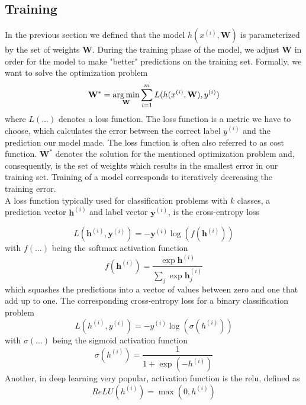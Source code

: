 \subsection{Training}
In the previous section we defined that the model $h(x^{(i)}, \mathbf{W})$ is parameterized by the set of weights $\textbf{W}$. During the training phase of the model, we adjust $\textbf{W}$ in order for the model to make "better" predictions on the training set. Formally, we want to solve the optimization problem
\begin{equation}
   \mathbf{W}^{*} = \operatorname*{arg\,min}_\textbf{W} \sum_{i=1}^{m} L(h(x^{(i)}, \mathbf{W}), y^{(i)})
   \label{eq:optimization}
\end{equation}
where $L(...)$ denotes a loss function. The loss function is a metric we have to choose, which calculates the error between the correct label $y^{(i)}$ and the prediction our model made. The loss function is often also referred to as cost function. $\mathbf{W}^{*}$ denotes the solution for the mentioned optimization problem and, consequently, is the set of weights which results in the smallest error in our training set. Training of a model corresponds to iteratively decreasing the training error.\\
A loss function typically used for classification problems with $k$ classes, a prediction vector $\mathbf{h}^{(i)}$ and label vector $\mathbf{y}^{(i)}$, is the cross-entropy loss

\begin{equation}
    L(\mathbf{h}^{(i)}, \mathbf{y}^{(i)}) = -\mathbf{y}^{(i)} \log(f(\mathbf{h}^{(i)}))
    \label{eq:cross_entropy_multi}
\end{equation}
with $f(...)$ being the softmax activation function
\begin{equation}
   f(\mathbf{h}^{(i)}) = \frac{\exp\mathbf{h}^{(i)}}{\sum_{j} \exp{\mathbf{h}^{(i)}_{j}}}
   \label{eq:softmax}
\end{equation}
which squashes the predictions into a vector of values between zero and one that add up to one. The corresponding cross-entropy loss for a binary classification problem
\begin{equation}
    L({h}^{(i)}, {y}^{(i)}) = -{y}^{(i)} \log(\sigma({h}^{(i)}))
    \label{eq:cross_entropy_binary}
\end{equation}
with $\sigma(...)$ being the sigmoid activation function
\begin{equation}
   \sigma({h}^{(i)}) = \frac{1}{1 + \exp{(-{h}^{(i)})}}
   \label{eq:sigmoid}
\end{equation}
Another, in deep learning very popular, activation function is the \gls{relu}, defined as
\begin{equation}
   ReLU({h}^{(i)}) = \max(0, {h}^{(i)})
   \label{eq:relu}
\end{equation}

